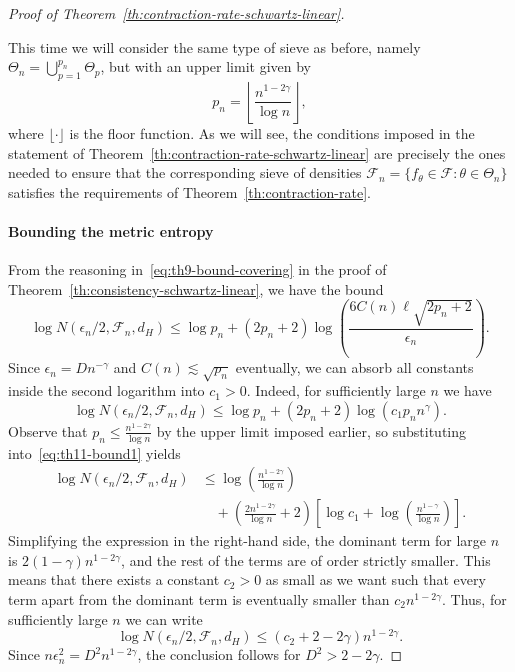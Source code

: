 \begin{proof}[Proof of Theorem~\ref{th:contraction-rate-schwartz-linear}]\label{proof:contraction-rate-schwartz-linear}

This time we will consider the same type of sieve as before, namely \(\Theta_n = \bigcup_{p=1}^{p_n}\Theta_p\), but with an upper limit given by
\[
  p_n=\left\lfloor\frac{n^{1-2\gamma}}{\log n}\right\rfloor,
\]
where \(\lfloor \cdot \rfloor\) is the floor function. As we will see, the conditions imposed in the statement of Theorem~\ref{th:contraction-rate-schwartz-linear} are precisely the ones needed to ensure that the corresponding sieve of densities \(\mathcal F_n=\{f_\theta\in\mathcal F: \theta \in \Theta_n\}\) satisfies the requirements of Theorem~\ref{th:contraction-rate}.

\paragraph{Bounding the metric entropy} From the reasoning in~\eqref{eq:th9-bound-covering} in the proof of Theorem~\ref{th:consistency-schwartz-linear}, we have the bound
\[
  \log N(\epsilon_n/2, \mathcal F_n, d_H)  \leq \log p_n + (2p_n+2)\log\left(\frac{6C(n) \ell\sqrt{2p_n+2}}{\epsilon_n}\right).
\]
Since \(\epsilon_n=Dn^{-\gamma}\) and \(C(n)\lesssim  \sqrt{p_n}\) eventually, we can absorb all constants inside the second logarithm into \(c_1>0\). Indeed, for sufficiently large \(n\) we have
\begin{equation}\label{eq:th11-bound1}
  \log N(\epsilon_n/2, \mathcal F_n, d_H)  \leq \log p_n + (2p_n+2)\log\left(c_1 p_n n^\gamma\right).
\end{equation}
Observe that \(p_n\leq \frac{n^{1-2\gamma}}{\log n}\) by the upper limit imposed earlier, so substituting into~\eqref{eq:th11-bound1} yields
\begin{align*}
  \log N(\epsilon_n/2, \mathcal F_n, d_H) & \leq \log \left(\frac{n^{1-2\gamma}}{\log n}\right)\\
  &\quad + \left(\frac{2n^{1-2\gamma}}{\log n} + 2\right)\left[\log c_1 + \log\left(\frac{n^{1-\gamma}}{\log n}\right)\right].
\end{align*}
Simplifying the expression in the right-hand side, the dominant term for large \(n\) is \(2(1-\gamma)n^{1-2\gamma}\), and the rest of the terms are of order strictly smaller. This means that there exists a constant \(c_2>0\) as small as we want such that every term apart from the dominant term is eventually smaller than \(c_2 n^{1-2\gamma}\). Thus, for sufficiently large \(n\) we can write
\[
  \log N(\epsilon_n/2, \mathcal F_n, d_H)  \leq  (c_2 + 2-2\gamma)n^{1-2\gamma}.
\]
Since \(n\epsilon_n^2 =D^2n^{1-2\gamma}\), the conclusion follows for \(D^2>2-2\gamma\).


\end{proof}
